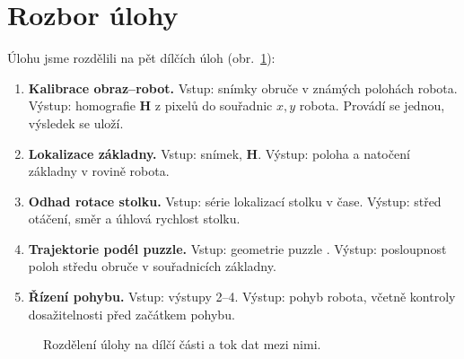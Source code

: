 \documentclass[11pt,a4paper]{article}
\newcommand{\T}{\mathbf{T}}
\begin{document}
\section{Rozbor úlohy}
\label{sec:rozbor}

Úlohu jsme rozdělili na pět dílčích úloh (obr.~\ref{fig:pipeline}):

\begin{enumerate}
  \item \textbf{Kalibrace obraz--robot.} Vstup: snímky obruče v známých polohách
        robota. Výstup: homografie $\mathbf{H}$ z pixelů do souřadnic $x,y$
        robota. Provádí se jednou, výsledek se uloží.
  \item \textbf{Lokalizace základny.} Vstup: snímek, $\mathbf{H}$. Výstup: poloha
        a natočení základny v rovině robota.
  \item \textbf{Odhad rotace stolku.} Vstup: série lokalizací stolku v čase. Výstup:
        střed otáčení, směr a úhlová rychlost stolku.
  \item \textbf{Trajektorie podél puzzle.} Vstup: geometrie puzzle \cite{rob1hw}.
        Výstup: posloupnost poloh středu obruče v souřadnicích základny.
  \item \textbf{Řízení pohybu.} Vstup: výstupy 2--4. Výstup: pohyb robota,
        včetně kontroly dosažitelnosti před začátkem pohybu.
\end{enumerate}

\begin{figure}[H]
  \centering
  \caption{Rozdělení úlohy na dílčí části a tok dat mezi nimi.}
  \label{fig:pipeline}
\end{figure}
\end{document}

